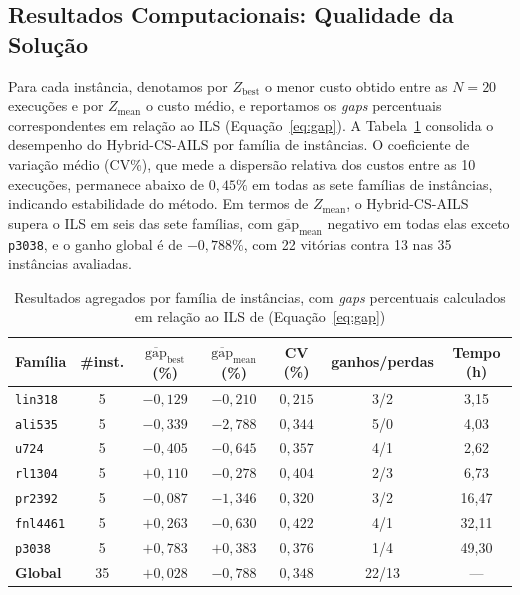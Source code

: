 \documentclass[a4paper,11pt]{article}
\begin{document}
\subsection{Resultados Computacionais: Qualidade da Solução}
\label{sec:results:overview}

Para cada instância, denotamos por $Z_{\mathrm{best}}$ o menor custo
obtido entre as $N=20$ execuções e por $Z_{\mathrm{mean}}$ o custo
médio, e reportamos os \emph{gaps} percentuais correspondentes em
relação ao ILS (Equação~\ref{eq:gap}). A Tabela~\ref{tab:family} consolida o desempenho do Hybrid-CS-AILS por
família de instâncias. O coeficiente de variação médio (CV\%), que mede a dispersão
relativa dos custos entre as 10 execuções, permanece abaixo de
$0{,}45\%$ em todas as sete famílias de instâncias, indicando estabilidade do
método. Em termos de $Z_{\mathrm{mean}}$, o Hybrid-CS-AILS supera o ILS
em seis das sete famílias, com $\overline{\mathrm{gap}}_{\mathrm{mean}}$
negativo em todas elas exceto \texttt{p3038}, e o ganho global é
de $-0{,}788\%$, com 22 vitórias contra 13 nas 35 instâncias avaliadas.

\begin{table}[!htb]
\centering
\caption{Resultados agregados por família de instâncias, com \emph{gaps} percentuais calculados em relação ao ILS de \cite{freitas2025ils_pmediana}
(Equação~\ref{eq:gap})}
\label{tab:family}
\small
\begin{tabular}{lcccccc}
\hline
Família & \#inst. & $\overline{\mathrm{gap}}_{\mathrm{best}}$ (\%)
        & $\overline{\mathrm{gap}}_{\mathrm{mean}}$ (\%)
        & CV (\%) & ganhos/perdas & Tempo (h) \\
\hline
\texttt{lin318}  & 5 & $-0{,}129$ & $-0{,}210$ & $0{,}215$ & 3/2 &  3{,}15 \\
\texttt{ali535}  & 5 & $-0{,}339$ & $-2{,}788$ & $0{,}344$ & 5/0 &  4{,}03 \\
\texttt{u724}    & 5 & $-0{,}405$ & $-0{,}645$ & $0{,}357$ & 4/1 &  2{,}62 \\
\texttt{rl1304}  & 5 & $+0{,}110$ & $-0{,}278$ & $0{,}404$ & 2/3 &  6{,}73 \\
\texttt{pr2392}  & 5 & $-0{,}087$ & $-1{,}346$ & $0{,}320$ & 3/2 & 16{,}47 \\
\texttt{fnl4461} & 5 & $+0{,}263$ & $-0{,}630$ & $0{,}422$ & 4/1 & 32{,}11 \\
\texttt{p3038}   & 5 & $+0{,}783$ & $+0{,}383$ & $0{,}376$ & 1/4 & 49{,}30 \\
\hline
\textbf{Global}  & 35 & $+0{,}028$ & $-0{,}788$ & $0{,}348$ & 22/13 & --- \\
\hline
\end{tabular}
\end{table}
\end{document}
